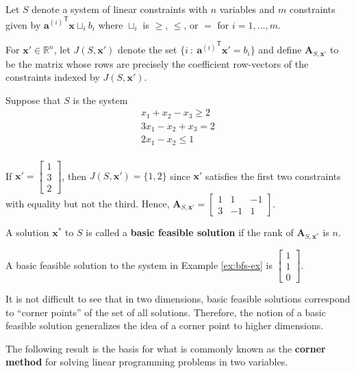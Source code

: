 \documentclass[]{book}
\newcommand{\RR}{\mathbb{R}}
\newcommand{\ssep}{~:~}
\newcommand{\T}{\mathsf{T}}
\newcommand{\mm}[1]{\mathbf{#1}}
\renewcommand{\vec}[1]{\mathbf{#1}}
\theoremstyle{definition}
\theoremstyle{definition}
\theoremstyle{remark}
\let\BeginKnitrBlock\begin \let\EndKnitrBlock\end
\begin{document}
Let \(S\) denote a system of linear constraints with \(n\) variables and
\(m\) constraints given by \({\vec{a}^{(i)}}^\T \vec{x} \sqcup_i b_i\)
where \(\sqcup_i\) is \(\geq\), \(\leq\), or \(=\) for
\(i = 1,\ldots, m\).

For \(\vec{x}' \in \RR^n\), let \(J(S,\vec{x}')\) denote the set
\(\{ i \ssep {\vec{a}^{(i)}}^\T \vec{x}' = b_i\}\) and define
\(\mm{A}_{S,\vec{x}'}\) to be the matrix whose rows are precisely the
coefficient row-vectors of the constraints indexed by \(J(S,\vec{x}')\).

\BeginKnitrBlock{example}
\protect\hypertarget{ex:bfs-ex}{}{\label{ex:bfs-ex}} Suppose that \(S\) is
the system
\begin{align*}
  x_1 + x_2 - x_3 \geq 2 \\
 3x_1 - x_2 + x_3 = 2 \\
 2x_1 - x_2  \leq 1 \\
\end{align*}

If \(\vec{x}' = \begin{bmatrix} 1 \\ 3 \\ 2\end{bmatrix}\), then
\(J(S,\vec{x}') = \{1,2\}\) since \(\vec{x}'\) satisfies the first two
constraints with equality but not the third. Hence,
\(\mm{A}_{S,\vec{x}'} = \begin{bmatrix} 1 & 1 & -1 \\ 3 & -1 & 1 \end{bmatrix}\).
\EndKnitrBlock{example}

\BeginKnitrBlock{definition}
\protect\hypertarget{def:unnamed-chunk-4}{}{\label{def:unnamed-chunk-4}}A
solution \(\vec{x}^*\) to \(S\) is called a \textbf{basic feasible
solution} if the rank of \(\mm{A}_{S,\vec{x}^*}\) is \(n\).
\EndKnitrBlock{definition}

A basic feasible solution to the system in Example \ref{ex:bfs-ex} is
\(\begin{bmatrix} 1 \\ 1\\ 0\end{bmatrix}.\)

It is not difficult to see that in two dimensions, basic feasible
solutions correspond to ``corner points'' of the set of all solutions.
Therefore, the notion of a basic feasible solution generalizes the idea
of a corner point to higher dimensions.

The following result is the basis for what is commonly known as the
\textbf{corner method} for solving linear programming problems in two
variables.
\end{document}
